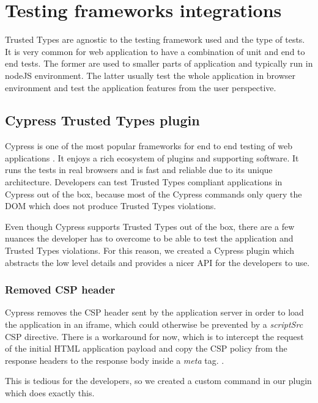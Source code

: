 \chapter{Testing frameworks integrations}


Trusted Types are agnostic to the testing framework used and the type of tests. It is very common
for web application to have a combination of unit and end to end tests. The former are used to
smaller parts of application and typically run in nodeJS environment. The latter usually test the
whole application in browser environment and test the application features from the user
perspective.

\section{Cypress Trusted Types plugin}
\label{cypress_testing_plugin}

Cypress is one of the most popular frameworks for end to end testing of web applications
\cite{js_state:testing}. It enjoys a rich ecosystem of plugins and supporting software. It runs the
tests in real browsers and is fast and reliable due to its unique architecture. Developers can test
Trusted Types compliant applications in Cypress out of the box, because most of the Cypress commands
only query the DOM which does not produce Trusted Types violations.

Even though Cypress supports Trusted Types out of the box, there are a few
nuances the developer has to overcome to be able to test the application and Trusted Types
violations. For this reason, we created a Cypress plugin which abstracts the low level details
and provides a nicer API for the developers to use.

\subsection{Removed CSP header}

Cypress removes the CSP header sent by the application server in order to load the application in an
iframe, which could otherwise be prevented by a \textit{scriptSrc} CSP directive. There is a
workaround for now, which is to intercept the request of the initial HTML application payload and
copy the CSP policy from the response headers to the response body inside a \textit{meta} tag.
\cite{cypress:csp_removal_issue}.

This is tedious for the developers, so we created a custom command in our plugin which does
exactly this.

